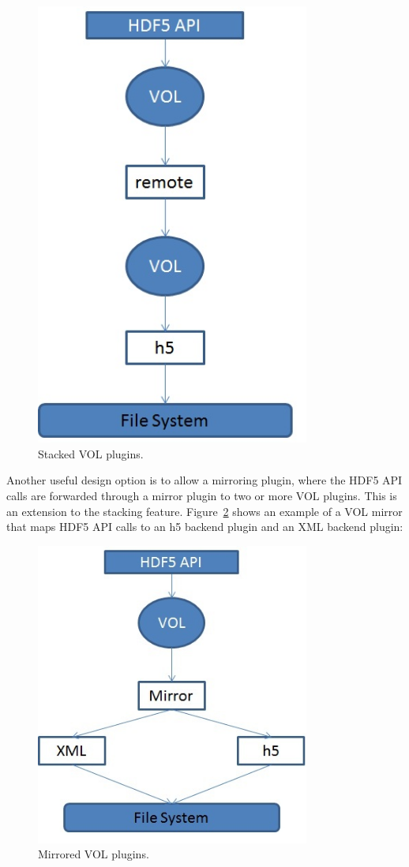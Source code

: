 \documentclass[letterpaper,hyper]{THG_RFC}
\begin{document}
\begin{figure}[h!]
\centering
\includegraphics[width=90mm]{stacked.jpg}
\caption{Stacked VOL plugins.}
\label{fig:stack}
\end{figure}

Another useful design option is to allow a mirroring plugin, where the HDF5 API calls are forwarded through a mirror plugin to two or more VOL plugins. This is an extension to the stacking feature. Figure~\ref{fig:mirror} shows an example of a VOL mirror that maps HDF5 API calls to an h5 backend plugin and an XML backend plugin:

\begin{figure}[h!]
\centering
\includegraphics[width=90mm]{mirrored.jpg}
\caption{Mirrored VOL plugins.}
\label{fig:mirror}
\end{figure}
\end{document}
